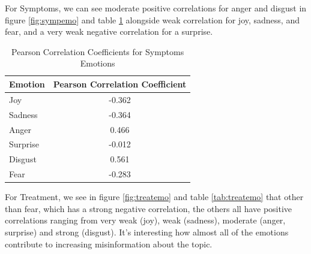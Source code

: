 \documentclass{l4proj}
\begin{document}
\begin{table}[H]
\begin{minipage}[c]{0.55\linewidth}
\label{fig:maskemo}
\end{minipage}
\end{table}

For Symptoms, we can see moderate positive correlations for anger and disgust in figure \ref{fig:sympemo} and table \ref{tab:sympemo} alongside weak correlation for joy, sadness, and fear, and a very weak negative correlation for a surprise.

\begin{table}[h]
\begin{minipage}[c]{\linewidth}
\centering
\begin{tabular}{@{}lc@{}}
\toprule
Emotion  & \multicolumn{1}{l}{Pearson Correlation Coefficient} \\ \midrule
Joy      & -0.362                                              \\
Sadness  & -0.364                                              \\
Anger    & 0.466                                              \\
Surprise & -0.012                                               \\
Disgust  & 0.561                                               \\
Fear     & -0.283                                              \\ \bottomrule
\end{tabular}
\caption{Pearson Correlation Coefficients for Symptoms Emotions}
\label{tab:sympemo}
\end{minipage}\hfill

\end{table}

For Treatment, we see in figure \ref{fig:treatemo} and table \ref{tab:treatemo} that other than fear, which has a strong negative correlation, the others all have positive correlations ranging from very weak (joy), weak (sadness), moderate (anger, surprise) and strong (disgust). It's interesting how almost all of the emotions contribute to increasing misinformation about the topic.
\end{document}
